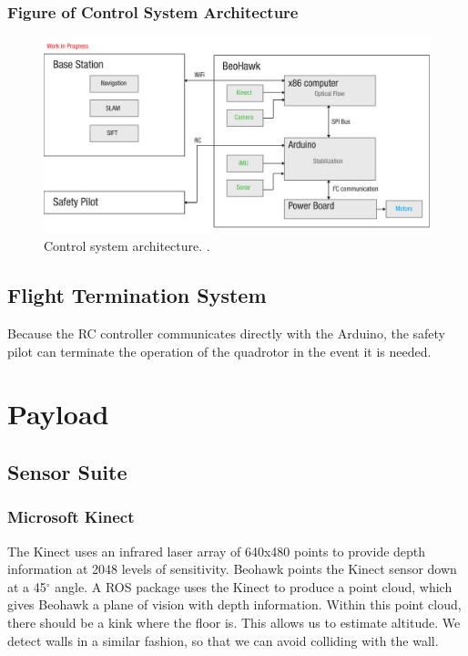 \documentclass[12pt, letterpaper]{article}
\begin{document}
\subsubsection{Figure of Control System Architecture}

\begin{figure}[h]
\centering
\includegraphics[width=14cm]{images/beohawk-system-arch.pdf}
\caption{Control system architecture. .} 
\label{fig:architecture}
\end{figure}


\subsection{Flight Termination System}
Because the RC controller communicates directly with the Arduino, the safety pilot can terminate the operation of the quadrotor in the event it is needed.

\section{Payload}
\subsection{Sensor Suite}
\subsubsection{Microsoft Kinect}
The Kinect uses an infrared laser array of 640x480 points to provide depth information at 2048 levels of sensitivity. Beohawk points the Kinect sensor down at a 45$^\circ$ angle.  A ROS package uses the Kinect to produce a point cloud, which gives Beohawk a plane of vision with depth information.  Within this point cloud, there should be a kink where the floor is.  This allows us to estimate altitude.  We detect walls in a similar fashion, so that we can avoid colliding with the wall.
\end{document}
